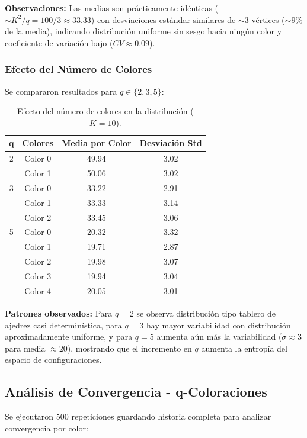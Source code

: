 \textbf{Observaciones:} Las medias son prácticamente idénticas ($\sim K^2/q = 100/3 \approx 33.33$) con desviaciones estándar similares de $\sim 3$ vértices ($\sim 9\%$ de la media), indicando distribución uniforme sin sesgo hacia ningún color y coeficiente de variación bajo ($CV \approx 0.09$).

\subsubsection{Efecto del Número de Colores}

Se compararon resultados para $q \in \{2, 3, 5\}$:

\begin{table}[H]
\centering
\begin{tabular}{|c|c|c|c|}
\hline
\textbf{q} & \textbf{Colores} & \textbf{Media por Color} & \textbf{Desviación Std} \\
\hline
2 & Color 0 & 49.94 & 3.02 \\
  & Color 1 & 50.06 & 3.02 \\
\hline
3 & Color 0 & 33.22 & 2.91 \\
  & Color 1 & 33.33 & 3.14 \\
  & Color 2 & 33.45 & 3.06 \\
\hline
5 & Color 0 & 20.32 & 3.32 \\
  & Color 1 & 19.71 & 2.87 \\
  & Color 2 & 19.98 & 3.07 \\
  & Color 3 & 19.94 & 3.04 \\
  & Color 4 & 20.05 & 3.01 \\
\hline
\end{tabular}
\caption{Efecto del número de colores en la distribución ($K=10$).}
\end{table}

\textbf{Patrones observados:} Para $q=2$ se observa distribución tipo tablero de ajedrez casi determinística, para $q=3$ hay mayor variabilidad con distribución aproximadamente uniforme, y para $q=5$ aumenta aún más la variabilidad ($\sigma \approx 3$ para media $\approx 20$), mostrando que el incremento en $q$ aumenta la entropía del espacio de configuraciones.

\subsection{Análisis de Convergencia - q-Coloraciones}

Se ejecutaron 500 repeticiones guardando historia completa para analizar convergencia por color:

